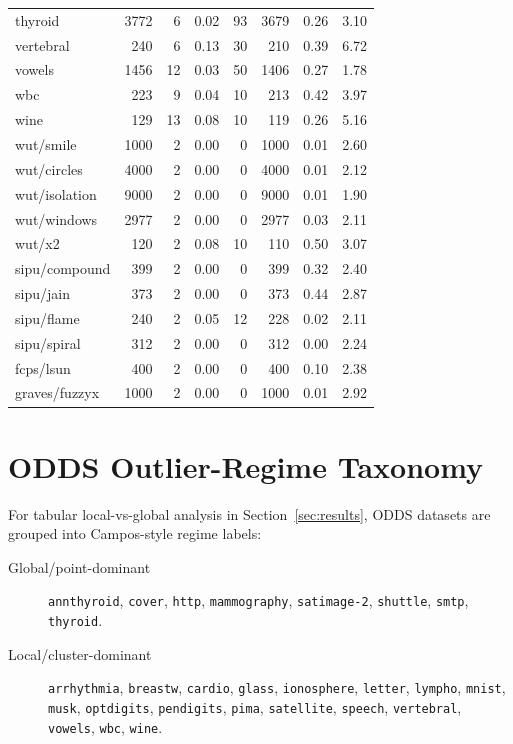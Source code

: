 \documentclass[cameraready]{Interspeech}
\begin{document}
\begin{table}[!ht]
\begin{tabular}{lrrrrrrr}
thyroid & 3772 & 6 & 0.02 & 93 & 3679 & 0.26 & 3.10 \\
vertebral & 240 & 6 & 0.13 & 30 & 210 & 0.39 & 6.72 \\
vowels & 1456 & 12 & 0.03 & 50 & 1406 & 0.27 & 1.78 \\
wbc & 223 & 9 & 0.04 & 10 & 213 & 0.42 & 3.97 \\
wine & 129 & 13 & 0.08 & 10 & 119 & 0.26 & 5.16 \\
wut/smile & 1000 & 2 & 0.00 & 0 & 1000 & 0.01 & 2.60 \\
wut/circles & 4000 & 2 & 0.00 & 0 & 4000 & 0.01 & 2.12 \\
wut/isolation & 9000 & 2 & 0.00 & 0 & 9000 & 0.01 & 1.90 \\
wut/windows & 2977 & 2 & 0.00 & 0 & 2977 & 0.03 & 2.11 \\
wut/x2 & 120 & 2 & 0.08 & 10 & 110 & 0.50 & 3.07 \\
sipu/compound & 399 & 2 & 0.00 & 0 & 399 & 0.32 & 2.40 \\
sipu/jain & 373 & 2 & 0.00 & 0 & 373 & 0.44 & 2.87 \\
sipu/flame & 240 & 2 & 0.05 & 12 & 228 & 0.02 & 2.11 \\
sipu/spiral & 312 & 2 & 0.00 & 0 & 312 & 0.00 & 2.24 \\
fcps/lsun & 400 & 2 & 0.00 & 0 & 400 & 0.10 & 2.38 \\
graves/fuzzyx & 1000 & 2 & 0.00 & 0 & 1000 & 0.01 & 2.92 \\
\bottomrule
\end{tabular}
\end{table}

\section{ODDS Outlier-Regime Taxonomy}

For tabular local-vs-global analysis in Section~\ref{sec:results}, ODDS datasets are grouped into Campos-style regime labels:
\begin{description}
    \item[Global/point-dominant] \texttt{annthyroid}, \texttt{cover}, \texttt{http}, \texttt{mammography}, \texttt{satimage-2}, \texttt{shuttle}, \texttt{smtp}, \texttt{thyroid}.
    \item[Local/cluster-dominant] \texttt{arrhythmia}, \texttt{breastw}, \texttt{cardio}, \texttt{glass}, \texttt{ionosphere}, \texttt{letter}, \texttt{lympho}, \texttt{mnist}, \texttt{musk}, \texttt{optdigits}, \texttt{pendigits}, \texttt{pima}, \texttt{satellite}, \texttt{speech}, \texttt{vertebral}, \texttt{vowels}, \texttt{wbc}, \texttt{wine}.
\end{description}
\end{document}
